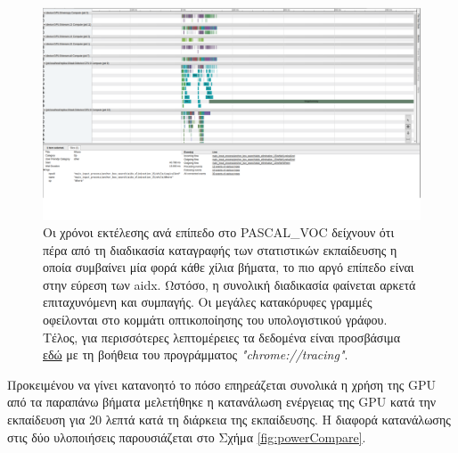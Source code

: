 \begin{figure}
\centering
\includegraphics[width=\textwidth]{figures/experiments/pascal_voc_tracing.pdf}
\caption[Χρόνοι εκτέλεσης κάθε επιπέδου στο PASCAL\_VOC]{Οι χρόνοι εκτέλεσης ανά επίπεδο στο PASCAL\_VOC δείχνουν ότι πέρα από τη διαδικασία καταγραφής των στατιστικών εκπαίδευσης η οποία συμβαίνει μία φορά κάθε χίλια βήματα, το πιο αργό επίπεδο είναι στην εύρεση των aidx. Ωστόσο, η συνολική διαδικασία φαίνεται αρκετά επιταχυνόμενη και συμπαγής. Οι μεγάλες κατακόρυφες γραμμές οφείλονται στο κομμάτι οπτικοποίησης του υπολογιστικού γράφου. Τέλος, για περισσότερες λεπτομέρειες τα δεδομένα είναι προσβάσιμα \textcolor{blue}{\href{https://drive.google.com/open?id=1M0m9nAsWXgn3K-tmZxeQARKTLJoRiH2s}{εδώ}} με τη βοήθεια του προγράμματος \textit{"chrome://tracing"}.}
\label{fig:pascal_tracing}
\end{figure}

Προκειμένου να γίνει κατανοητό το πόσο επηρεάζεται συνολικά η χρήση της GPU από τα παραπάνω βήματα μελετήθηκε η κατανάλωση ενέργειας της GPU κατά την εκπαίδευση για 20 λεπτά κατά τη διάρκεια της εκπαίδευσης. Η διαφορά κατανάλωσης στις δύο υλοποιήσεις παρουσιάζεται στο Σχήμα \ref{fig:powerCompare}.

